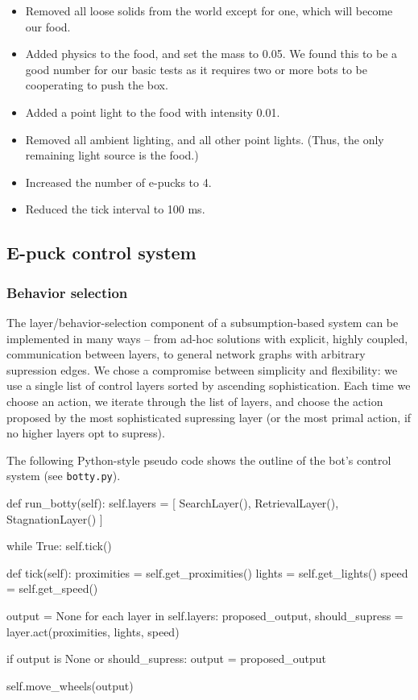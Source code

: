 \documentclass[a4paper,10pt]{article}
\newcommand{\numbots}{4}
\newcommand{\foodmass}{0.05}
\newcommand{\lightintensity}{0.01}
\newcommand{\tickinterval}{100 ms}
\begin{document}
\begin{itemize}
    \item Removed all loose solids from the world except for one, which will
    become our food.
    \item Added physics to the food, and set the mass to \foodmass.
    We found this to be a good number for our basic tests as it
    requires two or more bots to be cooperating to push the box.
    \item Added a point light to the food with intensity \lightintensity.
    \item Removed all ambient lighting, and all other point lights. (Thus, the
    only remaining light source is the food.)
    \item Increased the number of e-pucks to \numbots.
    \item Reduced the tick interval to \tickinterval.
\end{itemize}


\subsection{E-puck control system}
\label{sec:a2}

\subsubsection{Behavior selection}
The layer/behavior-selection component of a subsumption-based system can be
implemented in many ways -- from ad-hoc solutions with explicit, highly
coupled, communication between layers, to general network graphs with
arbitrary supression edges. We chose a compromise between simplicity and
flexibility: we use a single list of control layers sorted by ascending
sophistication. Each time we choose an action, we iterate through the list of
layers, and choose the action proposed by the most sophisticated supressing
layer (or the most primal action, if no higher layers opt to supress). 

The following Python-style pseudo code shows the outline of the
bot's control system (see \texttt{botty.py}).

\begin{python}
def run_botty(self):
    self.layers = [
        SearchLayer(),
        RetrievalLayer(),
        StagnationLayer()
    ]

    while True:
        self.tick()

def tick(self):
    proximities = self.get_proximities()
    lights      = self.get_lights()
    speed       = self.get_speed()

    output = None
    for each layer in self.layers:
        proposed_output, should_supress = layer.act(proximities, 
                                                    lights, speed)

        if output is None or should_supress:
            output = proposed_output

    self.move_wheels(output)
\end{python}
\end{document}
